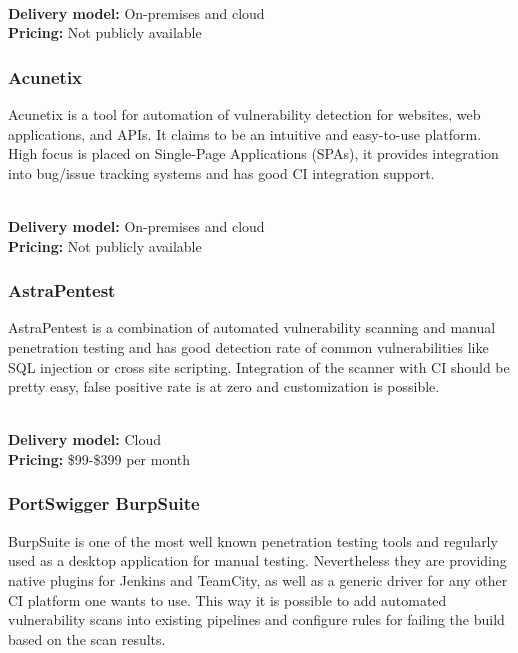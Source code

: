 \documentclass[conference]{IEEEtran}
\begin{document}
\noindent\\
\textbf{Delivery model:} On-premises and cloud
\noindent\\
\textbf{Pricing:} Not publicly available
\\

\noindent

\subsubsection{Acunetix \cite{dast2}}

Acunetix is a tool for automation of vulnerability detection for websites, web applications, and APIs. It claims to be an intuitive and easy-to-use platform. High focus is placed on Single-Page Applications (SPAs), it provides integration into bug/issue tracking systems and has good CI integration support.

\noindent\\
\textbf{Delivery model:} On-premises and cloud
\noindent\\
\textbf{Pricing:} Not publicly available
\\

\noindent
\subsubsection{AstraPentest \cite{dast3}}

AstraPentest is a combination of automated vulnerability scanning and manual penetration testing and has good detection rate of common vulnerabilities like SQL injection or cross site scripting. Integration of the scanner with CI should be pretty easy, false positive rate is at zero and customization is possible.

\noindent\\
\textbf{Delivery model:} Cloud
\noindent\\
\textbf{Pricing:} \$99-\$399 per month
\\

\noindent
\subsubsection{PortSwigger BurpSuite \cite{dast4}}

BurpSuite is one of the most well known penetration testing tools and regularly used as a desktop application for manual testing. Nevertheless they are providing native plugins for Jenkins and TeamCity, as well as a generic driver for any other CI platform one wants to use. This way it is possible to add automated vulnerability scans into existing pipelines and configure rules for failing the build based on the scan results.
\end{document}
